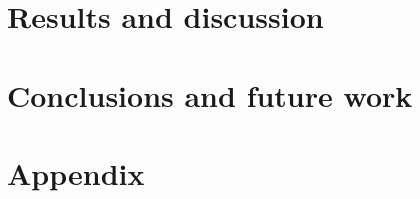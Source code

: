 \documentclass[a4paper,twocolumn,twoside]{article}
\begin{document}
	
	
	
	\section{Results and discussion}
	\label{Results and discussion}

	\section{Conclusions and future work}
	\label{Conclusions and future work}
    
	\section{Appendix}
	\label{Appendix}
	
		
	
		
	\clearpage 
\end{document}
